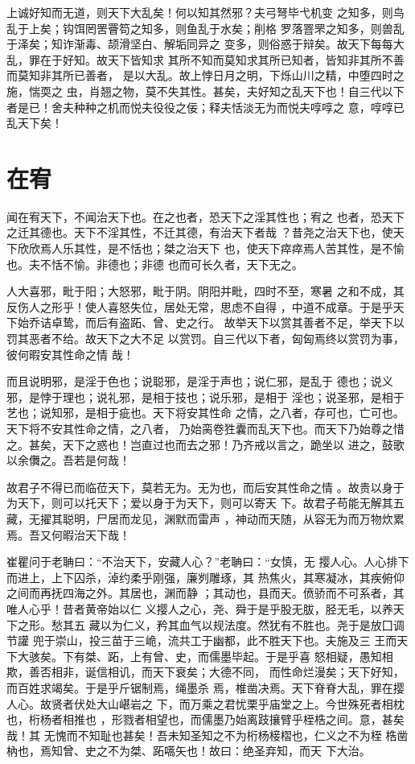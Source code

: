 \documentclass[12pt,UTF8]{ctexbook}
\begin{document}
上诚好知而无道，则天下大乱矣！何以知其然邪？夫弓弩毕弋机变 之知多，则鸟乱于上矣；钩饵罔罟罾笱之知多，则鱼乱于水矣；削格 罗落罯罘之知多，则兽乱于泽矣；知诈渐毒、颉滑坚白、解垢同异之 变多，则俗惑于辩矣。故天下每每大乱，罪在于好知。故天下皆知求 其所不知而莫知求其所已知者，皆知非其所不善而莫知非其所已善者， 是以大乱。故上悖日月之明，下烁山川之精，中堕四时之施，惴耎之 虫，肖翘之物，莫不失其性。甚矣，夫好知之乱天下也！自三代以下 者是已！舍夫种种之机而悦夫役役之佞；释夫恬淡无为而悦夫啍啍之 意，啍啍已乱天下矣！

\section{在宥}

闻在宥天下，不闻治天下也。在之也者，恐天下之淫其性也；宥之 也者，恐天下之迁其德也。天下不淫其性，不迁其德，有治天下者哉 ？昔尧之治天下也，使天下欣欣焉人乐其性，是不恬也；桀之治天下 也，使天下瘁瘁焉人苦其性，是不愉也。夫不恬不愉。非德也；非德 也而可长久者，天下无之。

人大喜邪，毗于阳；大怒邪，毗于阴。阴阳并毗，四时不至，寒暑 之和不成，其反伤人之形乎！使人喜怒失位，居处无常，思虑不自得 ，中道不成章。于是乎天下始乔诘卓鸷，而后有盗跖、曾、史之行。 故举天下以赏其善者不足，举天下以罚其恶者不给。故天下之大不足 以赏罚。自三代以下者，匈匈焉终以赏罚为事，彼何暇安其性命之情 哉！

而且说明邪，是淫于色也；说聪邪，是淫于声也；说仁邪，是乱于 德也；说义邪，是悖于理也；说礼邪，是相于技也；说乐邪，是相于 淫也；说圣邪，是相于艺也；说知邪，是相于疵也。天下将安其性命 之情，之八者，存可也，亡可也。天下将不安其性命之情，之八者， 乃始脔卷狌囊而乱天下也。而天下乃始尊之惜 之。甚矣，天下之惑也！岂直过也而去之邪！乃齐戒以言之，跪坐以 进之，鼓歌以余儛之。吾若是何哉！

故君子不得已而临莅天下，莫若无为。无为也，而后安其性命之情 。故贵以身于为天下，则可以托天下；爱以身于为天下，则可以寄天 下。故君子苟能无解其五藏，无擢其聪明，尸居而龙见，渊默而雷声 ，神动而天随，从容无为而万物炊累焉。吾又何暇治天下哉！

崔瞿问于老聃曰：“不治天下，安藏人心？”老聃曰：“女慎，无 撄人心。人心排下而进上，上下囚杀，淖约柔乎刚强，廉刿雕琢，其 热焦火，其寒凝冰，其疾俯仰之间而再抚四海之外。其居也，渊而静 ；其动也，县而天。偾骄而不可系者，其唯人心乎！昔者黄帝始以仁 义撄人之心，尧、舜于是乎股无胈，胫无毛，以养天下之形。愁其五 藏以为仁义，矜其血气以规法度。然犹有不胜也。尧于是放囗调节讙 兜于崇山，投三苗于三峗，流共工于幽都，此不胜天下也。夫施及三 王而天下大骇矣。下有桀、跖，上有曾、史，而儒墨毕起。于是乎喜 怒相疑，愚知相欺，善否相非，诞信相讥，而天下衰矣；大德不同， 而性命烂漫矣；天下好知，而百姓求竭矣。于是乎斤锯制焉，绳墨杀 焉，椎凿决焉。天下脊脊大乱，罪在撄人心。故贤者伏处大山嵁岩之 下，而万乘之君忧栗乎庙堂之上。今世殊死者相枕也，桁杨者相推也 ，形戮者相望也，而儒墨乃始离跂攘臂乎桎梏之间。意，甚矣哉！其 无愧而不知耻也甚矣！吾未知圣知之不为桁杨椄槢也，仁义之不为桎 梏凿枘也，焉知曾、史之不为桀、跖嚆矢也！故曰：绝圣弃知，而天 下大治。
\end{document}
